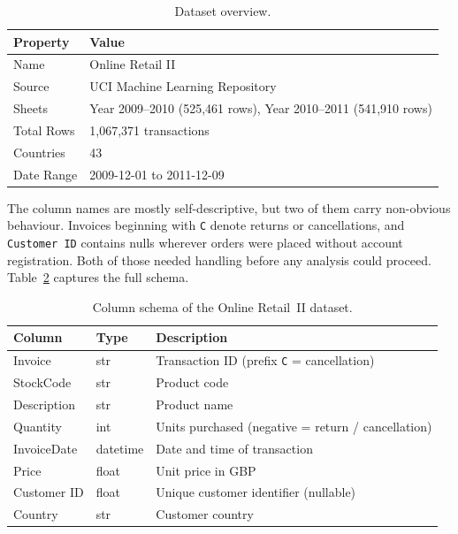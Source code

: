 \documentclass[12pt, a4paper]{article}
\begin{document}
\begin{table}[H]
\centering
\caption{Dataset overview.}
\label{tab:dataset_overview}
\begin{tabular}{@{}ll@{}}
\toprule
\textbf{Property}   & \textbf{Value} \\
\midrule
Name                 & Online Retail II \\
Source               & UCI Machine Learning Repository \\
Sheets               & Year 2009--2010 (525,461 rows), Year 2010--2011 (541,910 rows) \\
Total Rows           & 1,067,371 transactions \\
Countries            & 43 \\
Date Range           & 2009-12-01 to 2011-12-09 \\
\bottomrule
\end{tabular}
\end{table}

\noindent The column names are mostly self-descriptive, but two of them carry non-obvious behaviour. Invoices beginning with \texttt{C} denote returns or cancellations, and \texttt{Customer ID} contains nulls wherever orders were placed without account registration. Both of those needed handling before any analysis could proceed. Table~\ref{tab:columns} captures the full schema.

\begin{table}[H]
\centering
\caption{Column schema of the Online Retail~II dataset.}
\label{tab:columns}
\begin{tabular}{@{}lll@{}}
\toprule
\textbf{Column} & \textbf{Type} & \textbf{Description} \\
\midrule
Invoice      & str      & Transaction ID (prefix \texttt{C} = cancellation) \\
StockCode    & str      & Product code \\
Description  & str      & Product name \\
Quantity     & int      & Units purchased (negative = return / cancellation) \\
InvoiceDate  & datetime & Date and time of transaction \\
Price        & float    & Unit price in GBP \\
Customer ID  & float    & Unique customer identifier (nullable) \\
Country      & str      & Customer country \\
\bottomrule
\end{tabular}
\end{table}
\end{document}
